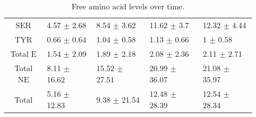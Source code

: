 \begin{table}[ht]
\begin{tabular}{cllll}
  SER & 4.57 $\pm$ 2.68 & 8.54 $\pm$ 3.62 & 11.62 $\pm$ 3.7 & 12.32 $\pm$ 4.44 \\
  TYR & 0.66 $\pm$ 0.64 & 1.04 $\pm$ 0.58 & 1.13 $\pm$ 0.66 & 1 $\pm$ 0.58 \\
  \hline
  Total	E & 1.54 $\pm$ 2.09	& 1.89 $\pm$ 2.18	& 2.08 $\pm$ 2.36	& 2.11 $\pm$ 2.71 \\
  Total NE	& 8.11  $\pm$ 16.62	& 15.52  $\pm$ 27.51 & 20.99  $\pm$ 36.07	& 21.08  $\pm$ 35.97 \\
  Total	& 5.16 $\pm$ 12.83	& 9.38 $\pm$ 21.54	& 12.48 $\pm$ 28.39	& 12.54 $\pm$ 28.34
  \end{tabular}
  \caption{Free amino acid levels over time.}
\end{table}
